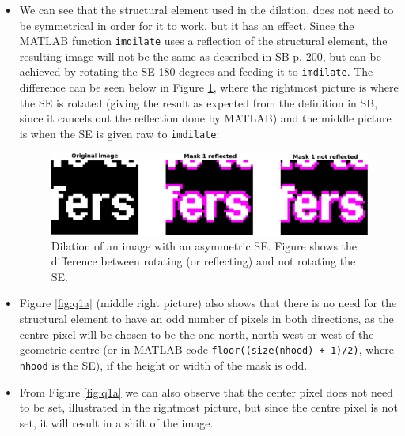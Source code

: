 \documentclass[a4paper]{article}
\begin{document}
\begin{itemize}
\item We can see that the structural element used in the dilation, does not need to be symmetrical in order for it to work, but it has an effect. Since the MATLAB function \texttt{imdilate} uses a reflection of the structural element, the resulting image will not be the same as described in SB p. 200, but can be achieved by rotating the SE 180 degrees and feeding it to \texttt{imdilate}. The difference can be seen below in Figure \ref{fig:symdif}, where the rightmost picture is where the SE is
rotated (giving the result as expected from the definition in SB, since it cancels out the reflection done by MATLAB) and the middle picture is when the SE is given raw to \texttt{imdilate}:
\begin{figure}[H]
\begin{center}
  \includegraphics[scale=0.5]{q1aa.pdf}
\end{center}
\caption{Dilation of an image with an asymmetric SE. Figure shows the difference between rotating (or reflecting) and not rotating the SE.}
\label{fig:symdif}
\end{figure}

\item Figure \ref{fig:q1a} (middle right picture) also shows that there is no need for the structural element to have an odd number of pixels in both directions, as the centre pixel will be chosen to be the one north, north-west or west of the geometric centre (or in MATLAB code \texttt{floor((size(nhood) + 1)/2)}, where \texttt{nhood} is the SE), if the height or width of the mask is odd.

\item From Figure \ref{fig:q1a} we can also observe that the center pixel does not need to be set, illustrated in the rightmost picture, but since the centre pixel is not set, it will result in a shift of the image.
\end{itemize}
\end{document}
